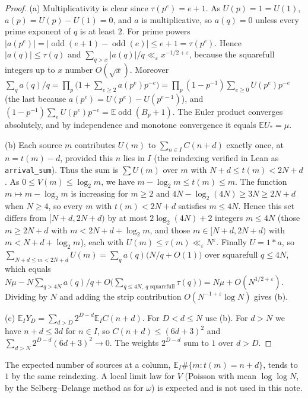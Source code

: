 \documentclass[11pt]{article}
\newcommand{\Ex}{\mathbb E}
\newcommand{\Av}{\mathbb E}
\begin{document}
\begin{proof}
(a) Multiplicativity is clear since $\tau(p^e)=e+1$. As $U(p)=1=U(1)$, $a(p)=U(p)-U(1)=0$, and $a$ is multiplicative, so $a(q)=0$ unless every prime exponent of $q$ is at least $2$. For prime powers $|a(p^e)|=|\operatorname{odd}(e+1)-\operatorname{odd}(e)|\le e+1=\tau(p^e)$. Hence $|a(q)|\le\tau(q)$ and $\sum_{q>x}|a(q)|/q\ll_\varepsilon x^{-1/2+\varepsilon}$, because the squarefull integers up to $x$ number $O(\sqrt x)$. Moreover $\sum_qa(q)/q=\prod_p\bigl(1+\sum_{e\ge2}a(p^e)p^{-e}\bigr)=\prod_p(1-p^{-1})\sum_{e\ge0}U(p^e)p^{-e}$ (the last because $a(p^e)=U(p^e)-U(p^{e-1})$), and $(1-p^{-1})\sum_eU(p^e)p^{-e}=\Ex\operatorname{odd}(B_p+1)$. The Euler product converges absolutely, and by independence and monotone convergence it equals $\Ex U_*=\mu$.

(b) Each source $m$ contributes $U(m)$ to $\sum_{n\in I}C(n+d)$ exactly once, at $n=t(m)-d$, provided this $n$ lies in $I$ (the reindexing verified in Lean as \texttt{arrival\_sum}). Thus the sum is $\sum U(m)$ over $m$ with $N+d\le t(m)<2N+d$. As $0\le V(m)\le\log_2m$, we have $m-\log_2m\le t(m)\le m$. The function $m\mapsto m-\log_2m$ is increasing for $m\ge2$ and $4N-\log_2(4N)\ge3N\ge2N+d$ when $N\ge4$, so every $m$ with $t(m)<2N+d$ satisfies $m\le4N$. Hence this set differs from $[N+d,2N+d)$ by at most $2\log_2(4N)+2$ integers $m\le4N$ (those $m\ge2N+d$ with $m<2N+d+\log_2 m$, and those $m\in[N+d,2N+d)$ with $m<N+d+\log_2m$), each with $U(m)\le\tau(m)\ll_\varepsilon N^\varepsilon$. Finally $U=1*a$, so $\sum_{N+d\le m<2N+d}U(m)=\sum_qa(q)\bigl(N/q+O(1)\bigr)$ over squarefull $q\le4N$, which equals $N\mu-N\sum_{q>4N}a(q)/q+O\bigl(\sum_{q\le4N,\ q\text{ squarefull}}\tau(q)\bigr)=N\mu+O(N^{1/2+\varepsilon})$. Dividing by $N$ and adding the strip contribution $O(N^{-1+\varepsilon}\log N)$ gives (b).

(c) $\Av_IY_D=\sum_{d>D}2^{D-d}\Av_IC(n+d)$. For $D<d\le N$ use (b). For $d>N$ we have $n+d\le3d$ for $n\in I$, so $C(n+d)\le(6d+3)^2$ and $\sum_{d>N}2^{D-d}(6d+3)^2\to0$. The weights $2^{D-d}$ sum to $1$ over $d>D$.
\end{proof}

\begin{remark}\label{rem:local}
The expected number of sources at a column, $\Av_I\#\{m:t(m)=n+d\}$, tends to $1$ by the same reindexing. A local limit law for $V$ (Poisson with mean $\log\log N$, by the Selberg--Delange method as for $\omega$) is expected and is not used in this note.
\end{remark}
\end{document}
